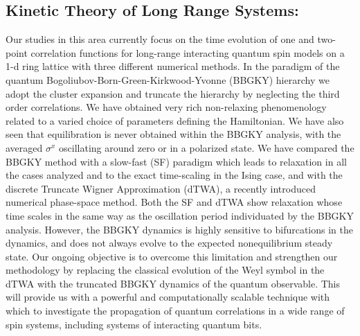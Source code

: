 \documentclass[a4paper,9pt]{article}
\begin{document}
\subsection{Kinetic Theory of Long Range Systems:}
Our studies in this area currently focus on  the time evolution of one and two-point correlation functions for long-range interacting quantum spin models on a 1-d ring lattice with three different numerical methods. In the paradigm of the quantum Bogoliubov-Born-Green-Kirkwood-Yvonne (BBGKY) hierarchy we adopt the cluster expansion and truncate the hierarchy by neglecting the third order correlations. We have obtained very rich non-relaxing phenomenology related to a varied choice of parameters defining the Hamiltonian. We have also seen that
equilibration is never obtained within the BBGKY analysis, with the averaged $\sigma^x$ oscillating around zero or in a polarized state. We have compared the BBGKY method with a slow-fast (SF) paradigm which leads to relaxation in all the cases analyzed and to the exact time-scaling in the Ising case, and with the discrete Truncate Wigner Approximation (dTWA), a recently introduced numerical phase-space method. Both the SF and dTWA show relaxation whose time scales in the same way as the oscillation period individuated by the BBGKY analysis. However, the BBGKY dynamics is highly sensitive to bifurcations in the dynamics, and does not always evolve to the expected nonequilibrium steady state. Our ongoing objective is to overcome this limitation and strengthen our methodology by replacing the classical evolution of the Weyl symbol in the dTWA with the truncated BBGKY dynamics of the quantum observable. This will provide us with a powerful and computationally scalable technique with which to investigate the propagation of quantum correlations in a wide range of spin systems, including systems of interacting quantum bits.
\end{document}
